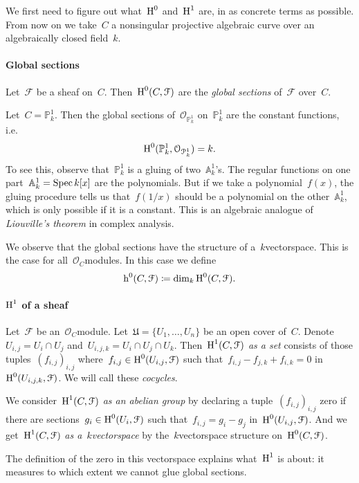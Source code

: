 \documentclass[10pt,a4paper]{article}
\begin{document}
We first need to figure out what~$\operatorname{H}^0$ and~$\operatorname{H}^1$ are, in as concrete terms as possible. From now on we take~$C$ a nonsingular projective algebraic curve over an algebraically closed field~$k$.
\paragraph{Global sections}
\begin{definition}
  Let~$\mathcal{F}$ be a sheaf on~$C$. Then~$\operatorname{H}^0(C,\mathcal{F})$ are the \emph{global sections} of~$\mathcal{F}$ over~$C$.
\end{definition}
\begin{example}
  Let~$C=\mathbb{P}_k^1$. Then the global sections of~$\mathcal{O}_{\mathbb{P}_k^1}$ on~$\mathbb{P}_k^1$ are the constant functions, i.e.
  \begin{equation}
    \operatorname{H}^0(\mathbb{P}_k^1,\mathcal{O}_{\mathcal{P}_k^1})=k.
  \end{equation}
  To see this, observe that~$\mathbb{P}_k^1$ is a gluing of two~$\mathbb{A}_k^1$'s. The regular functions on one part~$\mathbb{A}_k^1=\operatorname{Spec} k[x]$ are the polynomials. But if we take a polynomial~$f(x)$, the gluing procedure tells us that~$f(1/x)$ should be a polynomial on the other~$\mathbb{A}_k^1$, which is only possible if it is a constant. This is an algebraic analogue of \emph{Liouville's theorem} in complex analysis.
\end{example}
We observe that the global sections have the structure of a~$k$\dash vectorspace. This is the case for all~$\mathcal{O}_C$\dash modules. In this case we define
\begin{equation}
  \operatorname{h}^0(C,\mathcal{F})\coloneqq\dim_k\operatorname{H}^0(C,\mathcal{F}).
\end{equation}

\paragraph{$\operatorname{H}^1$ of a sheaf}
\begin{definition}
  Let~$\mathcal{F}$ be an~$\mathcal{O}_C$\dash module. Let~$\mathfrak{U}=\{U_1,\dotsc,U_n\}$ be an open cover of~$C$. Denote~$U_{i,j}=U_i\cap U_j$ and~$U_{i,j,k}=U_i\cap U_j\cap U_k$. Then~$\operatorname{H}^1(C,\mathcal{F})$ \emph{as a set} consists of those tuples~$(f_{i,j})_{i,j}$ where~$f_{i,j}\in\operatorname{H}^0(U_{i,j},\mathcal{F})$ such that~$f_{i,j}-f_{j,k}+f_{i,k}=0$ in~$\operatorname{H}^0(U_{i,j,k},\mathcal{F})$. We will call these \emph{cocycles}.

  We consider~$\operatorname{H}^1(C,\mathcal{F})$ \emph{as an abelian group} by declaring a tuple~$(f_{i,j})_{i,j}$ zero if there are sections~$g_i\in\operatorname{H}^0(U_i,\mathcal{F})$ such that~$f_{i,j}=g_i-g_j$ in~$\operatorname{H}^0(U_{i,j},\mathcal{F})$. And we get~$\operatorname{H}^1(C,\mathcal{F})$ \emph{as a~$k$\dash vectorspace} by the~$k$\dash vectorspace structure on~$\operatorname{H}^0(C,\mathcal{F})$.
\end{definition}
The definition of the zero in this vectorspace explains what~$\operatorname{H}^1$ is about: it measures to which extent we cannot glue global sections.
\end{document}
